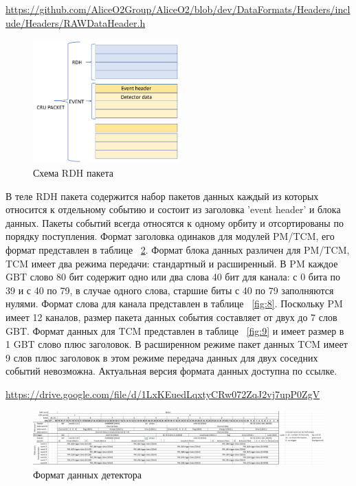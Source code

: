 \documentclass{article}
\begin{document}
\url{https://github.com/AliceO2Group/AliceO2/blob/dev/DataFormats/Headers/include/Headers/RAWDataHeader.h}


\begin{figure}[H]
	\centering 
	\includegraphics[width=0.5\textwidth]{RDH_scheme.png}
	\caption{\label{fig:6} Схема RDH пакета}
\end{figure}



В теле RDH пакета содержится набор пакетов данных каждый из которых относится к отдельному событию и состоит из заголовка 'event header' и блока данных. Пакеты событий всегда относятся к одному орбиту и отсортированы по порядку поступления. Формат заголовка одинаков для модулей PM/TCM, его формат представлен в таблице ~\ref{fig:7}. Формат блока данных различен для PM/TCM, TCM имеет два режима передачи: стандартный и расширенный. В PM каждое GBT слово 80 бит содержит одно или два слова 40 бит для канала: с 0 бита по 39 и с 40 по 79, в случае одного слова, старшие биты с 40 по 79 заполняются нулями. Формат слова для канала представлен в таблице ~\ref{fig:8}. Поскольку PM имеет 12 каналов, размер пакета данных события составляет от двух до 7 слов GBT. Формат данных для TCM представлен в таблице ~\ref{fig:9} и имеет размер в 1 GBT слово плюс заголовок. В расширенном режиме пакет данных TCM имеет 9 слов плюс заголовок в этом режиме передача данных для двух соседних событий невозможна. Актуальная версия формата данных доступна по ссылке.

\url{https://drive.google.com/file/d/1LxKEuedLqxtyCRw072ZqJ2vj7upP0ZgV}



\begin{figure}[H]
	\centering 
	\includegraphics[width=1\textwidth]{readout_format.png}
	\caption{\label{fig:7} Формат данных детектора}
\end{figure}
\end{document}
